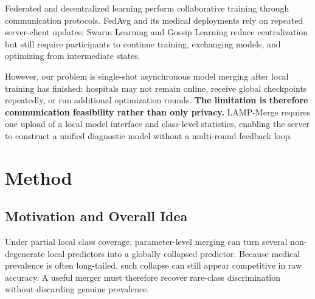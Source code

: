 \documentclass[letterpaper]{article} %
\begin{document}
Federated and decentralized learning perform collaborative training through communication protocols. FedAvg and its medical deployments rely on repeated server-client updates\cite{pmlr-v54-mcmahan17a,li2020fedprox,karimireddy2020scaffold,li2021fedbn,kaissis_secure_2020,sheller2020federated,rieke2020future,kairouz2021advances}; Swarm Learning and Gossip Learning reduce centralization but still require participants to continue training, exchanging models, and optimizing from intermediate states\cite{warnat-herresthal_swarm_2021,hegedhus_gossip_2019}.

However, our problem is single-shot asynchronous model merging after local training has finished: hospitals may not remain online, receive global checkpoints repeatedly, or run additional optimization rounds. \textbf{The limitation is therefore communication feasibility rather than only privacy.} LAMP-Merge requires one upload of a local model interface and class-level statistics, enabling the server to construct a unified diagnostic model without a multi-round feedback loop.

\section{Method}

\subsection{Motivation and Overall Idea}

Under partial local class coverage, parameter-level merging can turn several non-degenerate local predictors into a globally collapsed predictor. Because medical prevalence is often long-tailed, such collapse can still appear competitive in raw accuracy. A useful merger must therefore recover rare-class discrimination without discarding genuine prevalence.
\end{document}
